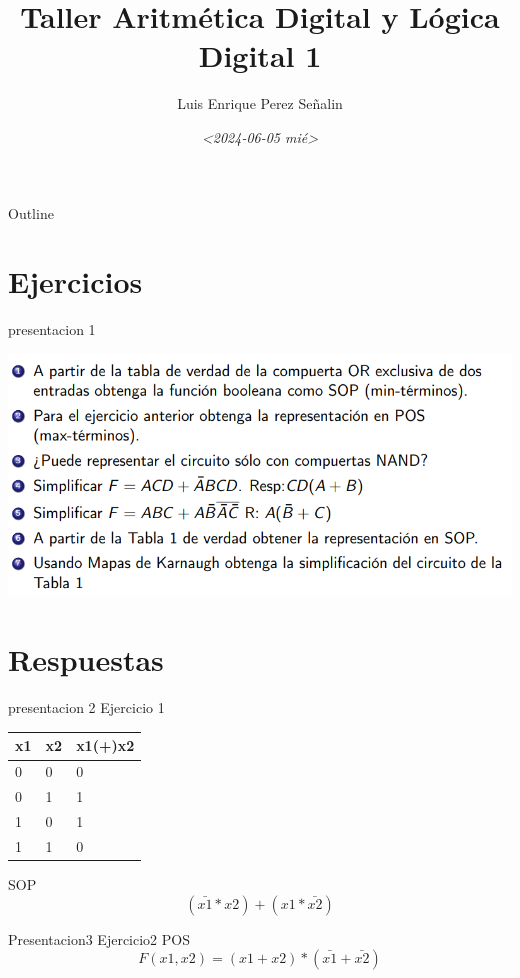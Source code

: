 \documentclass[presentation]{beamer}
\author{Luis Enrique Perez Señalin}
\date{\textit{<2024-06-05 mié>}}
\title{Taller Aritmética Digital y Lógica Digital 1}
\begin{document}
\maketitle
\begin{frame}{Outline}
\tableofcontents
\end{frame}


\section{Ejercicios}
\label{sec:org7a90f67}
\begin{frame}[label={sec:org582d926}]{presentacion 1}
\begin{center}
\includegraphics[width=.9\linewidth]{./enunciado1.png}
\end{center}
\end{frame}


\section{Respuestas}
\label{sec:org764525b}
\begin{frame}[label={sec:orgec27021}]{presentacion 2}
Ejercicio 1
\begin{center}
\begin{tabular}{|l|l|l|}
\hline
x1 & x2 & x1(+)x2 \\
\hline
0 & 0 & 0 \\
\hline
0 & 1 & 1 \\
\hline
1 & 0 & 1 \\
\hline
1 & 1 & 0 \\
\hline
\end{tabular}
\end{center}
SOP 
$$(\bar{x1}*x2)+(x1*\bar{x2})$$
\end{frame}
\begin{frame}[label={sec:org7146b5c}]{Presentacion3}
Ejercicio2
POS
$$F(x1,x2) = (x1+x2) * (\bar{x1}+\bar{x2})$$
\end{frame}
\end{document}
